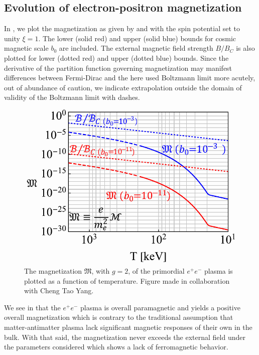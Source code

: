 \subsection{Evolution of electron-positron magnetization}
\label{sec:paramagnetism}
\noindent In , we plot the magnetization as given by  and  with the spin potential set to unity $\xi=1$. The lower (solid red) and upper (solid blue) bounds for cosmic magnetic scale $b_{0}$ are included. The external magnetic field strength ${B}/{B}_{C}$ is also plotted for lower (dotted red) and upper (dotted blue) bounds. Since the derivative of the partition function governing magnetization may manifest differences between Fermi-Dirac and the here used Boltzmann limit more acutely, out of abundance of caution, we indicate extrapolation outside the domain of validity of the Boltzmann limit with dashes.

\begin{figure}[ht]
 \centering
 \includegraphics[width=0.95\linewidth]{plots/chap04cosmo/thesis_mag.pdf}
 \caption{The magnetization ${\mathfrak M}$, with $g\!=\!2$, of the primordial $e^{+}e^{-}$ plasma is plotted as a function of temperature. Figure made in collaboration with Cheng Tao Yang.}
 \label{fig:magnet} 
\end{figure}

We see in  that the $e^{+}e^{-}$ plasma is overall paramagnetic and yields a positive overall magnetization which is contrary to the traditional assumption that matter-antimatter plasma lack significant magnetic responses of their own in the bulk. With that said, the magnetization never exceeds the external field under the parameters considered which shows a lack of ferromagnetic behavior. 

